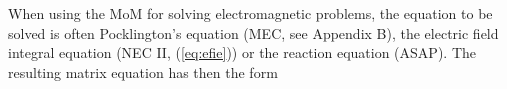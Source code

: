 \documentclass[a4paper,11pt]{thesis}
\begin{document}
When using the MoM for solving electromagnetic problems, the equation to be solved is often Pocklington's equation (MEC, see Appendix B), the electric field integral equation (NEC II, (\ref{eq:efie})) or the reaction equation (ASAP). The resulting matrix equation has then the form















\end{document}
